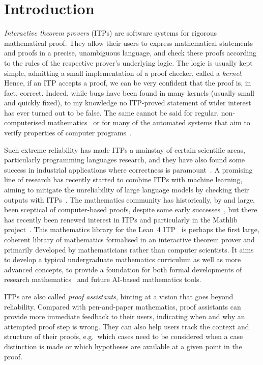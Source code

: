 \chapter{Introduction}%
\label{chap:intro}

\emph{Interactive theorem provers} (ITPs) are software systems for rigorous mathematical proof.
They allow their users to express mathematical statements and proofs in a precise, unambiguous language, and check these proofs according to the rules of the respective prover's underlying logic.
The logic is usually kept simple, admitting a small implementation of a proof checker, called a \emph{kernel}.
Hence, if an ITP accepts a proof, we can be very confident that the proof is, in fact, correct.
Indeed, while bugs have been found in many kernels (usually small and quickly fixed), to my knowledge no ITP-proved statement of wider interest has ever turned out to be false.
The same cannot be said for regular, non-computerised mathematics~\cite{Voevodsky14,Hales08} or for many of the automated systems that aim to verify properties of computer programs~\cite{CSmith,YinYang,OpFuzz,DeltaDebugSMT,HistFuzz,STORM}.

Such extreme reliability has made ITPs a mainstay of certain scientific areas, particularly programming languages research, and they have also found some success in industrial applications where correctness is paramount~\cite{seL4,CompCert,AWSFormal}.
A promising line of research has recently started to combine ITPs with machine learning, aiming to mitigate the unreliability of large language models by checking their outputs with ITPs~\cite{Lample22,LeanDojo,GoedelProver,DeepSeekProver,Aristotle}.
The mathematics community has historically, by and large, been sceptical of computer-based proofs, despite some early successes~\cite{FourColor,Kepler,OddOrder}, but there has recently been renewed interest in ITPs and particularly in the Mathlib project~\cite{Mathlib}.
This mathematics library for the Lean~4 ITP~\cite{Lean4} is perhaps the first large, coherent library of mathematics formalised in an interactive theorem prover and primarily developed by mathematicians rather than computer scientists.
It aims to develop a typical undergraduate mathematics curriculum as well as more advanced concepts, to provide a foundation for both formal developments of research mathematics~\cite{LiquidTensor,PFR} and future AI-based mathematics tools.

ITPs are also called \emph{proof assistants}, hinting at a vision that goes beyond reliability.
Compared with pen-and-paper mathematics, proof assistants can provide more immediate feedback to their users, indicating when and why an attempted proof step is wrong.
They can also help users track the context and structure of their proofs, e.g.\ which cases need to be considered when a case distinction is made or which hypotheses are available at a given point in the proof.

